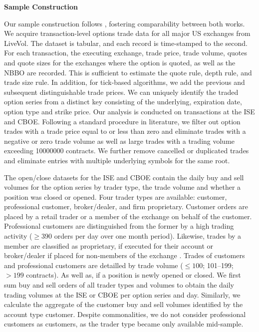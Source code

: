 \textbf{Sample Construction}

Our sample construction follows \textcite[][7--9]{grauerOptionTradeClassification2022}, fostering comparability between both works. We acquire transaction-level options trade data for all major US exchanges from LiveVol. The dataset is tabular, and each record is time-stamped to the second. For each transaction, the executing exchange, trade price, trade volume, quotes and quote sizes for the exchanges where the option is quoted, as well as the \gls{NBBO} are recorded. This is sufficient to estimate the quote rule, depth rule, and trade size rule. In addition, for tick-based algorithms, we add the previous and subsequent distinguishable trade prices. We can uniquely identify the traded option series from a distinct key consisting of the underlying, expiration date, option type and strike price. Our analysis is conducted on transactions at the \gls{ISE} and \gls{CBOE}. Following a standard procedure in literature, we filter out option trades with a trade price equal to or less than zero and eliminate trades with a negative or zero trade volume as well as large trades with a trading volume exceeding \num{10000000} contracts. We further remove cancelled or duplicated trades and eliminate entries with multiple underlying symbols for the same root.

The open/close datasets for the \gls{ISE} and \gls{CBOE} contain the daily buy and sell volumes for the option series by trader type, the trade volume and whether a position was closed or opened. Four trader types are available: customer, professional customer, broker/dealer, and firm proprietary. Customer orders are placed by a retail trader or a member of the exchange on behalf of the customer. Professional customers are distinguished from the former by a high trading activity ($\geq390$ orders per day over one month period). Likewise, trades by a member are classified as proprietary, if executed for their account or broker/dealer if placed for non-members of the exchange \autocite[][2]{nasdaqincFrequentlyAskedQuestions2017}. Trades of customers and professional customers are detailled by trade volume ($\leq 100$; 101--199; $> 199$ contracts). As well as, if a position is newly opened or closed. We first sum buy and sell orders of all trader types and volumes to obtain the daily trading volumes at the \gls{ISE} or \gls{CBOE} per option series and day. Similarly, we calculate the aggregate of the customer buy and sell volumes identified by the account type customer. Despite commonalities, we do not consider professional customers as customers, as the trader type became only available mid-sample.

